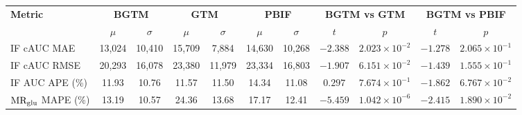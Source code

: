 \begin{sidewaystable}[b]
	\centering
	\small
	\setlength{\tabcolsep}{10pt}
	\begin{tabular}{l|cc|cc|cc|cc|cc}
		\toprule
		\multirow{2}{*}{\textbf{Metric}} & \multicolumn{2}{c|}{\textbf{BGTM}} & \multicolumn{2}{c|}{\textbf{GTM}} & \multicolumn{2}{c|}{\textbf{PBIF}} & \multicolumn{2}{c|}{\textbf{BGTM vs GTM}} & \multicolumn{2}{c}{\textbf{BGTM vs PBIF}}                                                                                                                  \\
		\cmidrule(lr){2-3} \cmidrule(lr){4-5} \cmidrule(lr){6-7} \cmidrule(lr){8-9} \cmidrule(lr){10-11}
		                                 & \(\mu\)                            & \(\sigma\)                        & \(\mu\)                            & \(\sigma\)                                & \(\mu\)                                   & \(\sigma\) & \(t\)      & \(p\)                              & \(t\)      & \(p\)                              \\
		\midrule
		IF cAUC MAE                      & 13{,}024                           & 10{,}410                          & 15{,}709                           & 7{,}884                                   & 14{,}630                                  & 10{,}268   & \(-2.388\) & \(2.023\times 10^{-2}\) \sym{*}    & \(-1.278\) & \(2.065\times 10^{-1}\)            \\
		IF cAUC RMSE                     & 20{,}293                           & 16{,}078                          & 23{,}380                           & 11{,}979                                  & 23{,}334                                  & 16{,}803   & \(-1.907\) & \(6.151\times 10^{-2}\) \sym{\dag} & \(-1.439\) & \(1.555\times 10^{-1}\)            \\
		IF AUC APE (\%)                  & 11.93                              & 10.76                             & 11.57                              & 11.50                                     & 14.34                                     & 11.08      & \(0.297\)  & \(7.674\times 10^{-1}\)            & \(-1.862\) & \(6.767\times 10^{-2}\) \sym{\dag} \\
		\midrule
		\(\text{MR}_{\text{glu}}\) MAPE (\%)             & 13.19                              & 10.57                             & 24.36                              & 13.68                                     & 17.17                                     & 12.41      & \(-5.459\) & \(1.042\times 10^{-6}\) \sym{***}  & \(-2.415\) & \(1.890\times 10^{-2}\) \sym{*}    \\

\end{tabular}
\end{sidewaystable}
